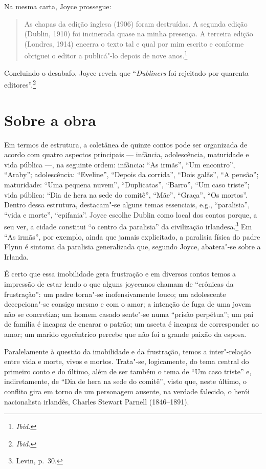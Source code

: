 Na mesma carta, Joyce prossegue: 

\begin{quote}
As chapas da edição inglesa (1906) foram destruídas. A segunda edição (Dublin, 1910) foi
incinerada quase na minha presença. A terceira edição (Londres, 1914) encerra o
texto tal e qual por mim escrito e conforme obriguei o editor a publicá"-lo
depois de nove anos.\footnote{ \textit{Ibid.}}
\end{quote}

Concluindo o desabafo, Joyce revela que
“\textit{Dubliners} foi rejeitado por quarenta editores”.\footnote{ \textit{Ibid.}}

\section{Sobre a obra}

Em termos de estrutura, a coletânea de quinze contos pode ser organizada de
acordo com quatro aspectos principais --- infância, adolescência, maturidade
e vida pública ---, na seguinte ordem: infância: “As irmãs”, “Um encontro”,
“Araby”; adolescência: “Eveline”, “Depois da corrida”, “Dois galãs”, “A
pensão”; maturidade: “Uma pequena nuvem”, “Duplicatas”, “Barro”, “Um caso
triste”; vida pública: “Dia de hera na sede do comitê”, “Mãe”, “Graça”, “Os
mortos”. Dentro dessa estrutura, destacam"-se alguns temas essenciais, e.g.,
“paralisia”, “vida e morte”, “epifania”.  Joyce escolhe Dublin como local dos
contos porque, a seu ver, a cidade constitui “o centro da paralisia” da
civilização irlandesa.\footnote{ Levin, p.~30.} Em “As irmãs”, por exemplo, ainda que
jamais explicitado, a paralisia física do padre Flynn é sintoma da paralisia
generalizada que, segundo Joyce, abatera"-se sobre a Irlanda.

É certo que essa imobilidade gera frustração e em diversos contos temos a
impressão de estar lendo o que alguns joyceanos chamam de “crônicas da
frustração”: um padre torna"-se inofensivamente louco; um adolescente
decepciona"-se consigo mesmo e com o amor; a intenção de fuga de uma jovem não
se concretiza; um homem casado sente"-se numa “prisão perpétua”; um pai de
família é incapaz de encarar o patrão; um asceta é incapaz de corresponder ao
amor; um marido egocêntrico percebe que não foi a grande paixão da esposa.

Paralelamente à questão da imobilidade e da frustração, temos a inter"-relação
entre vida e morte, vivos e mortos. Trata"-se, logicamente, do tema central do
primeiro conto e do último, além de ser também o tema de “Um caso triste” e,
indiretamente, de “Dia de hera na sede do comitê”, visto que, neste último, o
conflito gira em torno de um personagem ausente, na verdade falecido, o herói
nacionalista irlandês, Charles Stewart Parnell (1846--1891).

